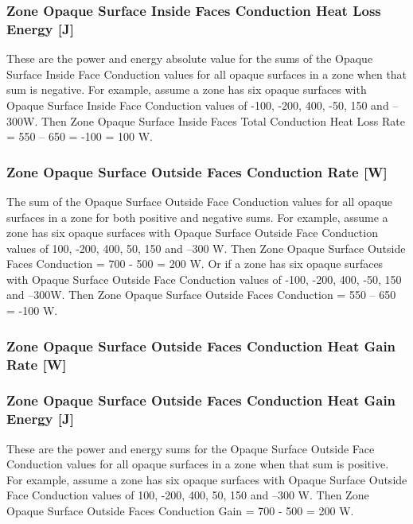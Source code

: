 \subsubsection{Zone Opaque Surface Inside Faces Conduction Heat Loss Energy {[}J{]}}\label{zone-opaque-surface-inside-faces-conduction-heat-loss-energy-j}

These are the power and energy absolute value for the sums of the Opaque Surface Inside Face Conduction values for all opaque surfaces in a zone when that sum is negative. For example, assume a zone has six opaque surfaces with Opaque Surface Inside Face Conduction values of -100, -200, 400, -50, 150 and --300W. Then Zone Opaque Surface Inside Faces Total Conduction Heat Loss Rate = \textbar{}550 -- 650\textbar{} = \textbar{}-100\textbar{} = 100 W.

\subsubsection{Zone Opaque Surface Outside Faces Conduction Rate {[}W{]}}\label{zone-opaque-surface-outside-face-conduction-w}

The sum of the Opaque Surface Outside Face Conduction values for all opaque surfaces in a zone for both positive and negative sums. For example, assume a zone has six opaque surfaces with Opaque Surface Outside Face Conduction values of 100, -200, 400, 50, 150 and --300 W. Then Zone Opaque Surface Outside Faces Conduction = 700 - 500 = 200 W. Or if a zone has six opaque surfaces with Opaque Surface Outside Face Conduction values of -100, -200, 400, -50, 150 and --300W. Then Zone Opaque Surface Outside Faces Conduction = 550 -- 650 = -100 W.

\subsubsection{Zone Opaque Surface Outside Faces Conduction Heat Gain Rate {[}W{]}}\label{zone-opaque-surface-outside-face-conduction-gain-w}

\subsubsection{Zone Opaque Surface Outside Faces Conduction Heat Gain Energy {[}J{]}}\label{zone-opaque-surface-outside-face-conduction-gain-energy-j}

These are the power and energy sums for the Opaque Surface Outside Face Conduction values for all opaque surfaces in a zone when that sum is positive. For example, assume a zone has six opaque surfaces with Opaque Surface Outside Face Conduction values of 100, -200, 400, 50, 150 and --300 W. Then Zone Opaque Surface Outside Faces Conduction Gain = 700 - 500 = 200 W.

